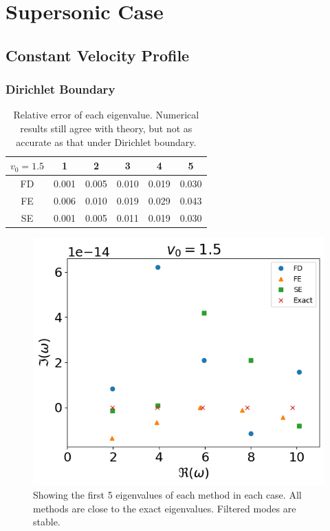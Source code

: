 \section{Supersonic Case}
\subsection{Constant Velocity Profile}
\subsubsection*{Dirichlet Boundary}
\begin{table} [H]
	\centering
	\caption{Relative error of each eigenvalue. Numerical results still agree with theory, but not as accurate as that under Dirichlet boundary.}
	\begin{tabular}{|c|c|c|c|c|c|}
		\hline
		$v_0=1.5$ & 1     & 2     & 3     & 4     & 5     \\
		\hline
		FD        & 0.001 & 0.005 & 0.010 & 0.019 & 0.030 \\
		\hline
		FE        & 0.006 & 0.010 & 0.019 & 0.029 & 0.043 \\
		\hline
		SE        & 0.001 & 0.005 & 0.011 & 0.019 & 0.030 \\
		\hline
	\end{tabular}
	\label{table:eigenvalue-error-dirichlet-supersonic}
\end{table}

\begin{figure}[H]
	\centering
	\includegraphics[width=0.7\linewidth]{figures/fixed-fixed-constant-v-v0=1.5}
	\caption{Showing the first 5 eigenvalues of each method in each case. All methods are close to the exact eigenvalues. Filtered modes are stable.}
	\label{fig:constant-v-dirichlet-supersonic}
\end{figure}

